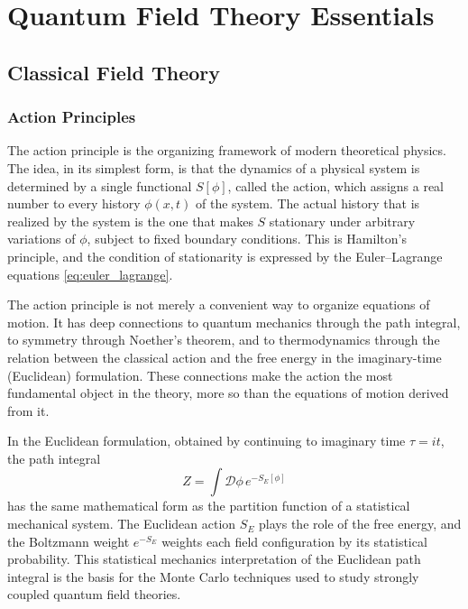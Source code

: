 \documentclass[11pt, twoside, openright]{book}
\theoremstyle{dotted}
\theoremstyle{definition}
\begin{document}
\part{Quantum Field Theory Essentials}

\chapter{Classical Field Theory}
\label{ch:classical_ft}

\section{Action Principles}

The action principle is the organizing framework of modern theoretical physics.
The idea, in its simplest form, is that the dynamics of a physical system is
determined by a single functional $S[\phi]$, called the action, which assigns
a real number to every history $\phi(x,t)$ of the system. The actual history that
is realized by the system is the one that makes $S$ stationary under arbitrary
variations of $\phi$, subject to fixed boundary conditions. This is Hamilton's
principle, and the condition of stationarity is expressed by the Euler--Lagrange
equations \eqref{eq:euler_lagrange}.

The action principle is not merely a convenient way to organize equations of motion.
It has deep connections to quantum mechanics through the path integral, to symmetry
through Noether's theorem, and to thermodynamics through the relation between
the classical action and the free energy in the imaginary-time (Euclidean) formulation.
These connections make the action the most fundamental object in the theory, more
so than the equations of motion derived from it.

In the Euclidean formulation, obtained by continuing to imaginary time $\tau = it$,
the path integral
\begin{equation}
  Z = \int \mathcal{D}\phi \, e^{-S_E[\phi]}
  \label{eq:euclidean_path_integral}
\end{equation}
has the same mathematical form as the partition function of a statistical mechanical
system. The Euclidean action $S_E$ plays the role of the free energy, and the
Boltzmann weight $e^{-S_E}$ weights each field configuration by its statistical
probability. This statistical mechanics interpretation of the Euclidean path integral
is the basis for the Monte Carlo techniques used to study strongly coupled quantum
field theories.
\end{document}
